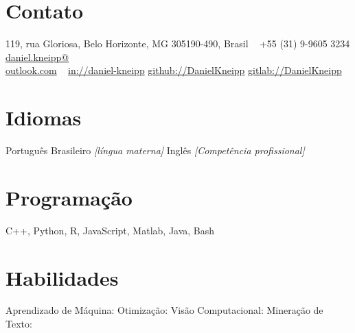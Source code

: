 \documentclass[a4paper]{cv-friggeri-x}
\begin{document}


\begin{aside} %
\section{Contato}
\pin \hfill 119, rua Gloriosa,
Belo Horizonte, MG 
305190-490, Brasil
~
{\Large\textcolor{gray}{\Mobilefone}} \hfill +55 (31) 9-9605 3234
{\Large\textcolor{gray}{\Letter}} \hfill \href{mailto:daniel.kneipp@outlook.com}{daniel.kneipp@\\outlook.com}
~
\llogo \hfill \href{https://www.linkedin.com/in/daniel-kneipp/}{in://daniel-kneipp}
\githublogo \hfill \href{https://github.com/DanielKneipp}{github://DanielKneipp}
\gitlablogo \hfill \href{https://gitlab.com/DanielKneipp}{gitlab://DanielKneipp}
\section{Idiomas}
Português Brasileiro \hspace{5mm}\null
\textit{[língua materna]}
Inglês  \hspace{5mm}\null
\textit{[Competência profissional]}
\section{Programação}
C++, Python, R, JavaScript,
Matlab, Java, Bash
~
\section{Habilidades}
Aprendizado \hspace{5mm}\null
de Máquina: \hspace{5mm}\null
{} 
Otimização:     \hspace{5mm}\null  
{}
Visão Computacional:  \hspace{5mm}\null
{}
Mineração de Texto:      \hspace{5mm}\null
{}
\end{aside}
\end{document}
